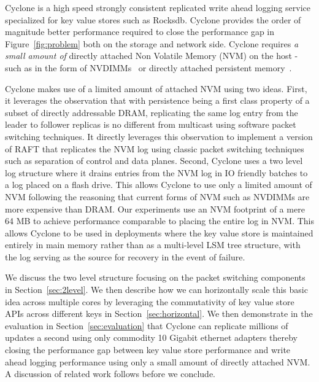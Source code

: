 \documentclass[10pt, preprint, nonatbib]{sigplanconf}
\begin{document}
Cyclone is a high speed strongly consistent replicated write ahead logging
service specialized for key value stores such as Rocksdb. Cyclone provides the
order of magnitude better performance required to close the performance gap in
Figure~\ref{fig:problem} both on the storage and network side. Cyclone requires
\emph{a small amount of} directly attached Non Volatile Memory (NVM) on the
host - such as in the form of NVDIMMs~\cite{farm} or directly attached
persistent memory~\cite{pmfs}.

Cyclone makes use of a limited amount of attached NVM using two ideas. First, it
leverages the observation that with persistence being a first class property of
a subset of directly addressable DRAM, replicating the same log entry from the
leader to follower replicas is no different from multicast using software packet
switching techniques. It directly leverages this observation to implement a
version of RAFT that replicates the NVM log using classic packet switching
techniques such as separation of control and data planes. Second, Cyclone uses a
two level log structure where it drains entries from the NVM log in IO friendly
batches to a log placed on a flash drive. This allows Cyclone to use only a
limited amount of NVM following the reasoning that current forms of NVM such as
NVDIMMs are more expensive than DRAM. Our experiments use an NVM footprint of a
mere 64 MB to achieve performance comparable to placing the entire log in
NVM. This allows Cyclone to be used in deployments where the key value store is
maintained entirely in main memory rather than as a multi-level LSM tree
structure, with the log serving as the source for recovery in the event of
failure.

We discuss the two level structure focusing on the packet switching components
in Section~\ref{sec:2level}. We then describe how we can horizontally scale this
basic idea across multiple cores by leveraging the commutativity of key value
store APIs across different keys in Section~\ref{sec:horizontal}. We then
demonstrate in the evaluation in Section~\ref{sec:evaluation} that Cyclone can
replicate millions of updates a second using only commodity 10 Gigabit ethernet
adapters thereby closing the performance gap between key value store performance
and write ahead logging performance using only a small amount of directly
attached NVM. A discussion of related work follows before we conclude.
\end{document}
